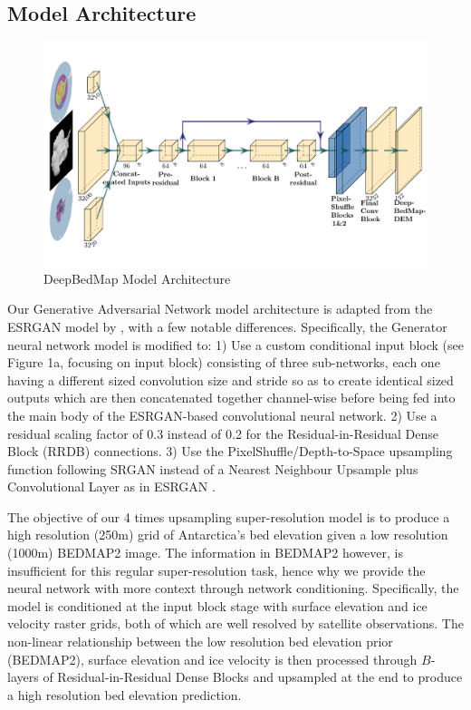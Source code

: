 \documentclass[tc, manuscript]{copernicus}
\begin{document}
\subsection{Model Architecture}

\begin{figure}[h]
  \includegraphics[width=16cm]{figures/deepbedmap_architecture.pdf}
  \caption{DeepBedMap Model Architecture}
  \label{}
\end{figure}

Our Generative Adversarial Network model architecture is adapted from the ESRGAN model by \citet{WangESRGANEnhancedSuperResolution2018}, with a few notable differences.
Specifically, the Generator neural network model is modified to:
1) Use a custom conditional input block (see Figure 1a, focusing on input block) consisting of three sub-networks, each one having a different sized convolution size and stride so as to create identical sized outputs which are then concatenated together channel-wise before being fed into the main body of the ESRGAN-based convolutional neural network.
2) Use a residual scaling factor \citep{SzegedyInceptionv4InceptionResNetImpact2016} of 0.3 instead of 0.2 for the Residual-in-Residual Dense Block (RRDB) connections.
3) Use the PixelShuffle/Depth-to-Space upsampling function \citep{ShiRealTimeSingleImage2016} following SRGAN \citep{LedigPhotoRealisticSingleImage2016} instead of a Nearest Neighbour Upsample plus Convolutional Layer as in ESRGAN \citep{WangESRGANEnhancedSuperResolution2018}.

The objective of our 4 times upsampling super-resolution model is to produce a high resolution (250m) grid of Antarctica's bed elevation given a low resolution (1000m) BEDMAP2 \citep{FretwellBedmap2improvedice2013} image.
The information in BEDMAP2 however, is insufficient for this regular super-resolution task, hence why we provide the neural network with more context through network conditioning.
Specifically, the model is conditioned at the input block stage with surface elevation and ice velocity raster grids, both of which are well resolved by satellite observations.
The non-linear relationship between the low resolution bed elevation prior (BEDMAP2), surface elevation and ice velocity is then processed through $B$-layers of Residual-in-Residual Dense Blocks and upsampled at the end to produce a high resolution bed elevation prediction.
\end{document}
